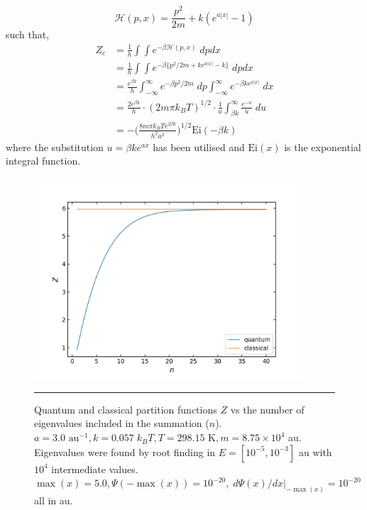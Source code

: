 \documentclass[../main.tex]{subfiles}
\begin{document}
\begin{equation}
\mathcal{H}(p, x) = \frac{p^2}{2m} + k (e^{a|x|} - 1)
\end{equation} 
such that,
\begin{equation}
\begin{aligned}
Z_c &= \frac{1}{h}\int\int e^{-\beta \mathcal{H}(p, x)} \; dp dx \\
&=  \frac{1}{h}\int\int e^{-\beta \{{p^2}/{2m} + k e^{a|x|} - k\}} \; dp dx \\
&=  \frac{e^{\beta k}}{h}\int_{-\infty}^\infty e^{-\beta {p^2}/{2m}} \;dp \int_{-\infty}^\infty e^{-\beta k e^{a|x|}} \;  dx \\
&=  \frac{2e^{\beta k}}{h} \cdot (2m\pi k_B T)^{1/2} \cdot \frac{1}{a} \int_{\beta k}^\infty \frac{e^{-u}}{u} \;  du \\
&=  -{\Big (} \frac{8m\pi k_B Te^{2\beta k}}{h^2a^2} {\Big )}^{1/2}  \text{Ei}(-\beta k)
\end{aligned}
\end{equation}
where the substitution $u = \beta k e^{ax}$ has been utilised and $\text{Ei}(x)$ is the exponential integral function.
\begin{figure}[h!]
	\centering
	\includegraphics[height=7.5cm]{4/figs/1d_exp_well_z_qunatum_classical}
	\vspace{0.2cm}
	\hrule
	\caption{Quantum and classical partition functions $Z$ vs the number of eigenvalues included in the summation ($n$). $a = 3.0 \text{ au}^{-1}, k = 0.057 \; k_B T, T = 298.15 \text{ K}, m =8.75 \times 10^4$ au. Eigenvalues were found by root finding in $E= [10^{-5}, 10^{-3}]$ au with $10^4$ intermediate values. $\max(x) = 5.0, \Psi(-\!\max(x)) = 10^{-20},\; d\Psi(x)/dx|_{-\!\max(x)} = 10^{-20}$ all in au.} 
	\label{1d_exp_well_z_qunatum_classical}
\end{figure}
\end{document}
